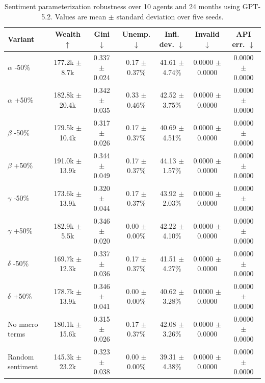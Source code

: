 \ifdefined\FinEvoAllowHistoricalPrePZeroEvidence\else
{}
\fi
\begin{table}[t]
\centering
\small
\setlength{\tabcolsep}{4pt}
\begin{tabular}{lcccccc}
\toprule
Variant & Wealth $\uparrow$ & Gini $\downarrow$ & Unemp. $\downarrow$ & Infl. dev. $\downarrow$ & Invalid $\downarrow$ & API err. $\downarrow$ \\
\midrule
$\alpha$ -50\% & 177.2k $\pm$ 8.7k & 0.337 $\pm$ 0.024 & 0.17 $\pm$ 0.37\% & 41.61 $\pm$ 4.74\% & 0.0000 $\pm$ 0.0000 & 0.0000 $\pm$ 0.0000 \\
$\alpha$ +50\% & 182.8k $\pm$ 20.4k & 0.342 $\pm$ 0.035 & 0.33 $\pm$ 0.46\% & 42.52 $\pm$ 3.75\% & 0.0000 $\pm$ 0.0000 & 0.0000 $\pm$ 0.0000 \\
$\beta$ -50\% & 179.5k $\pm$ 10.4k & 0.317 $\pm$ 0.026 & 0.17 $\pm$ 0.37\% & 40.69 $\pm$ 4.51\% & 0.0000 $\pm$ 0.0000 & 0.0000 $\pm$ 0.0000 \\
$\beta$ +50\% & 191.0k $\pm$ 13.9k & 0.344 $\pm$ 0.049 & 0.17 $\pm$ 0.37\% & 44.13 $\pm$ 1.57\% & 0.0000 $\pm$ 0.0000 & 0.0000 $\pm$ 0.0000 \\
$\gamma$ -50\% & 173.6k $\pm$ 13.9k & 0.320 $\pm$ 0.044 & 0.17 $\pm$ 0.37\% & 43.92 $\pm$ 2.03\% & 0.0000 $\pm$ 0.0000 & 0.0000 $\pm$ 0.0000 \\
$\gamma$ +50\% & 182.9k $\pm$ 5.5k & 0.346 $\pm$ 0.020 & 0.00 $\pm$ 0.00\% & 42.22 $\pm$ 4.10\% & 0.0000 $\pm$ 0.0000 & 0.0000 $\pm$ 0.0000 \\
$\delta$ -50\% & 169.7k $\pm$ 12.3k & 0.337 $\pm$ 0.036 & 0.17 $\pm$ 0.37\% & 41.51 $\pm$ 4.27\% & 0.0000 $\pm$ 0.0000 & 0.0000 $\pm$ 0.0000 \\
$\delta$ +50\% & 178.7k $\pm$ 13.9k & 0.346 $\pm$ 0.041 & 0.00 $\pm$ 0.00\% & 40.62 $\pm$ 3.28\% & 0.0000 $\pm$ 0.0000 & 0.0000 $\pm$ 0.0000 \\
No macro terms & 180.1k $\pm$ 15.6k & 0.315 $\pm$ 0.026 & 0.17 $\pm$ 0.37\% & 42.08 $\pm$ 3.26\% & 0.0000 $\pm$ 0.0000 & 0.0000 $\pm$ 0.0000 \\
Random sentiment & 145.3k $\pm$ 23.2k & 0.323 $\pm$ 0.038 & 0.00 $\pm$ 0.00\% & 39.31 $\pm$ 4.38\% & 0.0000 $\pm$ 0.0000 & 0.0000 $\pm$ 0.0000 \\
\bottomrule
\end{tabular}
\caption{Sentiment parameterization robustness over 10 agents and 24 months using GPT-5.2. Values are mean $\pm$ standard deviation over five seeds.}
\label{tab:sentiment_robustness}
\end{table}
